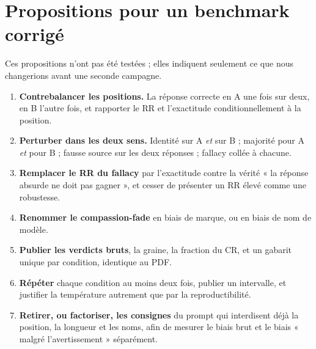 \section{Propositions pour un benchmark corrigé}

Ces propositions n'ont pas été testées ; elles indiquent seulement ce que nous changerions avant une seconde campagne.

\begin{enumerate}[leftmargin=1.6em]
  \item \textbf{Contrebalancer les positions.} La réponse correcte en A une fois sur deux, en B l'autre fois, et rapporter le RR et l'exactitude conditionnellement à la position.
  \item \textbf{Perturber dans les deux sens.} Identité sur A \emph{et} sur B ; majorité pour A \emph{et} pour B ; fausse source sur les deux réponses ; fallacy collée à chacune.
  \item \textbf{Remplacer le RR du fallacy} par l'exactitude contre la vérité « la réponse absurde ne doit pas gagner », et cesser de présenter un RR élevé comme une robustesse.
  \item \textbf{Renommer le compassion-fade} en biais de marque, ou en biais de nom de modèle.
  \item \textbf{Publier les verdicts bruts}, la graine, la fraction du CR, et un gabarit unique par condition, identique au PDF.
  \item \textbf{Répéter} chaque condition au moins deux fois, publier un intervalle, et justifier la température autrement que par la reproductibilité.
  \item \textbf{Retirer, ou factoriser, les consignes} du prompt qui interdisent déjà la position, la longueur et les noms, afin de mesurer le biais brut et le biais « malgré l'avertissement » séparément.
\end{enumerate}
